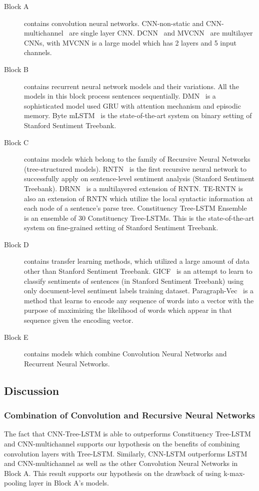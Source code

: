 \begin{description}
	\item[Block A] contains convolution neural networks.
	CNN-non-static and CNN-multichannel~\cite{KimCNN} are single layer CNN.
	DCNN~\cite{DCNN} and MVCNN~\cite{2-layer-cnn} are multilayer CNNs, with MVCNN is a large model  which has 2 layers and 5 input channels.
	\item[Block B] contains recurrent neural network models and their variations.
	All the models in this block process sentences sequentially.
	DMN~\cite{attention-gru} is a sophisticated model used GRU with attention mechanism and episodic memory.
	Byte mLSTM~\cite{mlstm} is the state-of-the-art system on binary setting of Stanford Sentiment Treebank.
	\item[Block C] contains models which belong to the family of Recursive Neural Networks (tree-structured models).
	RNTN~\cite{socher2013recursive} is the first recursive neural network to successfully apply on sentence-level sentiment analysis (Stanford Sentiment Treebank).
	DRNN~\cite{IrsoyDRNN} is a multilayered extension of RNTN.
	TE-RNTN is also an extension of RNTN which utilize the local syntactic information at each node of a sentence's parse tree.
	Constituency Tree-LSTM Ensemble~\cite{LooksHHN17} is an ensemble of 30 Constituency Tree-LSTMs.
	This is the state-of-the-art system on fine-grained setting of Stanford Sentiment Treebank.
	\item[Block D] contains transfer learning methods, which utilized a large amount of data other than Stanford Sentiment Treebank.
	GICF~\cite{group-instance} is an attempt to learn to classify sentiments of sentences (in Stanford Sentiment Treebank) using only document-level sentiment labels training dataset.
	Paragraph-Vec~\cite{ParagraphVec} is a method that learns to encode any sequence of words into a vector with the purpose of maximizing the likelihood of words which appear in that sequence given the encoding vector.
	\item[Block E] contains models which combine Convolution Neural Networks and Recurrent Neural Networks.
\end{description}
\subsection{Discussion}
\subsubsection{Combination of Convolution and Recursive Neural Networks}
The fact that CNN-Tree-LSTM is able to outperforms Constituency Tree-LSTM~\cite{treeLSTM} and CNN-multichannel\cite{KimCNN} supports our hypothesis on the benefits of combining convolution layers with Tree-LSTM.
Similarly, CNN-LSTM outperforms LSTM~\cite{treeLSTM} and CNN-multichannel\cite{KimCNN} as well as the other Convolution Neural Networks in Block A. 
This result supports our hypothesis on the drawback of using k-max-pooling layer in Block A's models.
